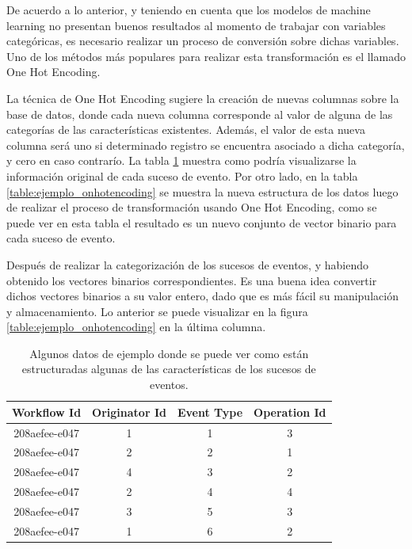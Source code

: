 De acuerdo a lo anterior, y teniendo en cuenta que los modelos de machine learning no presentan buenos resultados al momento de trabajar con variables categóricas, es necesario realizar un proceso de conversión sobre dichas variables. Uno de los métodos más populares para realizar esta transformación es el llamado One Hot Encoding.

La técnica de One Hot Encoding sugiere la creación de nuevas columnas sobre la base de datos, donde cada nueva columna corresponde al valor de alguna de las categorías de las características existentes. Además, el valor de esta nueva columna será uno si determinado registro se encuentra asociado a dicha categoría, y cero en caso contrarío. La tabla \ref{table:ejemplo_categorias} muestra como podría visualizarse la información original de cada suceso de evento. Por otro lado, en la tabla \ref{table:ejemplo_onhotencoding} se muestra la nueva estructura de los datos luego de realizar el proceso de transformación usando One Hot Encoding, como se puede ver en esta tabla el resultado es un nuevo conjunto de vector binario para cada suceso de evento.

Después de realizar la categorización de los sucesos de eventos, y habiendo obtenido los vectores binarios correspondientes. Es una buena idea convertir dichos vectores binarios a su valor entero, dado que es más fácil su manipulación y almacenamiento. Lo anterior se puede visualizar en la figura \ref{table:ejemplo_onhotencoding} en la última columna. 

\begin{table}
    \centering
    \begin{tabular}{||c || c || c || c||} 
        \hline
            Workflow Id & Originator Id & Event Type & Operation Id \\ [0.5ex] 
        \hline\hline
            208aefee-e047 & 1 & 1 & 3 \\ 
        \hline
            208aefee-e047 & 2 & 2 & 1 \\
        \hline
            208aefee-e047 & 4 & 3 & 2 \\
        \hline
            208aefee-e047 & 2 & 4 & 4 \\
        \hline
            208aefee-e047 & 3 & 5 & 3 \\
        \hline
            208aefee-e047 & 1 & 6 & 2 \\
        \hline
    \end{tabular}
    \caption[Ejemplo características sucesos de eventos]{Algunos datos de ejemplo donde se puede ver como están estructuradas algunas de las características de los sucesos de eventos.}
    \label{table:ejemplo_categorias}
\end{table}

